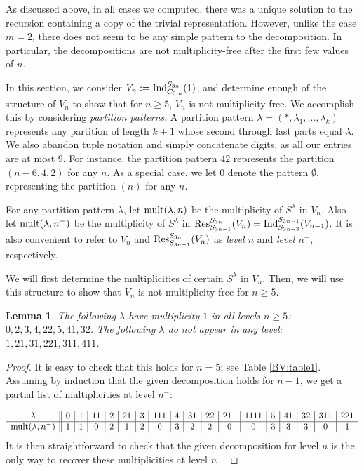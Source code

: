 \documentclass[12pt]{amsart}
\newtheorem{lemma}[theorem]{Lemma}
\numberwithin{theorem}{section}
\newcommand{\Ind}{\textup{Ind}}
\newcommand{\Res}{\textup{Res}}
\newcommand{\mult}{\textup{mult}}
\begin{document}
As discussed above, in all cases we computed, there was a unique
solution to the recursion containing a copy of the trivial representation.
However, unlike the case $m=2$, there does not seem to be any simple pattern to the decomposition.
In particular, the decompositions are not multiplicity-free after the first few values of $n$.

In this section, we consider $V_n := \Ind_{C_{3,n}}^{S_{3n}}(1)$, and determine enough of the structure of $V_n$ to show that
for $n \ge 5$, $V_n$ is not multiplicity-free.
We accomplish this by considering {\em partition patterns}.
A partition pattern $\lambda = (*,\lambda_1,\ldots,\lambda_k)$ represents any partition of length $k+1$ whose second through last parts equal $\lambda$.
We also abandon tuple notation and simply concatenate digits, as all our entries are at most 9.
For instance, the partition pattern $42$ represents the partition $(n-6,4,2)$ for any $n$.
As a special case, we let $0$ denote the pattern $\emptyset$, representing the partition $(n)$ for any $n$.

For any partition pattern $\lambda$, let $\mult(\lambda,n)$ be the multiplicity of $S^\lambda$ in $V_n$.
Also let $\mult(\lambda,n^-)$ be the multiplicity of $S^\lambda$ in $\Res^{S_{3n}}_{S_{3n-1}}(V_n) = \Ind_{S_{3n-3}}^{S_{3n-1}}(V_{n-1})$.
It is also convenient to refer to $V_n$ and $\Res^{S_{3n}}_{S_{3n-1}}(V_n)$ as {\em level $n$} and {\em level $n^-$}, respectively.

We will first determine the multiplicities of certain $S^\lambda$ in $V_n$.
Then, we will use this structure to show that $V_n$ is not multiplicity-free for
$n \ge 5$.


\begin{lemma}\label{BV:inductivelemma}
The following $\lambda$ have multiplicity $1$ in all levels $n \ge 5$: 
$0,2,3,4,22,5,41,32$.
The following $\lambda$ do not appear in any level: $1,21,31,221,311,411$.
\end{lemma}
\begin{proof}
It is easy to check that this holds for $n=5$; see Table \ref{BV:table1}.
Assuming by induction that the
given decomposition holds for $n-1$, we get a partial list of multiplicities
at level $n^-$:


$$
\begin{array}{c||c|c|c|c|c|c|c|c|c|c|c|c|c|c|c|c|c}
\lambda &0&1&11&2&21&3&111&4&31&22&211&1111&5&41&32&311&221 \\ \hline
\mult(\lambda,n^-)&1&1&0&2&1&2&0&3&2&2&0&0&3&3&3&0&1
\end{array}
$$
It is then straightforward to check that
the given decomposition for level $n$ is the only way to recover these multiplicities at level $n^-$.
\end{proof}
\end{document}
